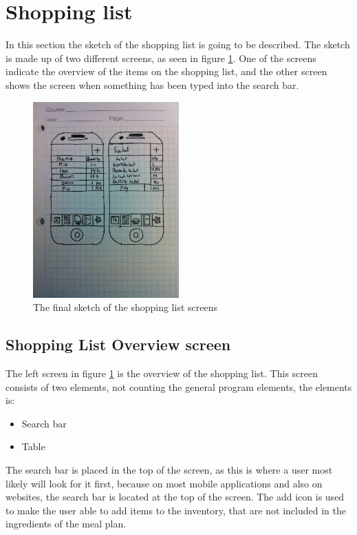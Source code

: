 \section{Shopping list}

In this section the sketch of the shopping list is going to be described. The sketch is made up of two different screens, as seen in figure \ref{FinalShoppingListSketch}. One of the screens indicate the overview of the items on the shopping list, and the other screen shows the screen when something has been typed into the search bar.

\begin{figure}[H]
    \centering
    \includegraphics[width=0.5\textwidth]{Grafik/FoodPlanner/FinalShoppingListSketch}
    \caption{The final sketch of the shopping list screens}
    \label{FinalShoppingListSketch}
\end{figure}

\subsection{Shopping List Overview screen}

The left screen in figure \ref{FinalShoppingListSketch} is the overview of the shopping list. This screen consists of two elements, not counting the general program elements, the elements is:

\begin{itemize}
	\item Search bar
	\item Table
\end{itemize}

The search bar is placed in the top of the screen, as this is where a user most likely will look for it first, because on most mobile applications and also on websites, the search bar is located at the top of the screen. The add icon is used to make the user able to add items to the inventory, that are not included in the ingredients of the meal plan.

